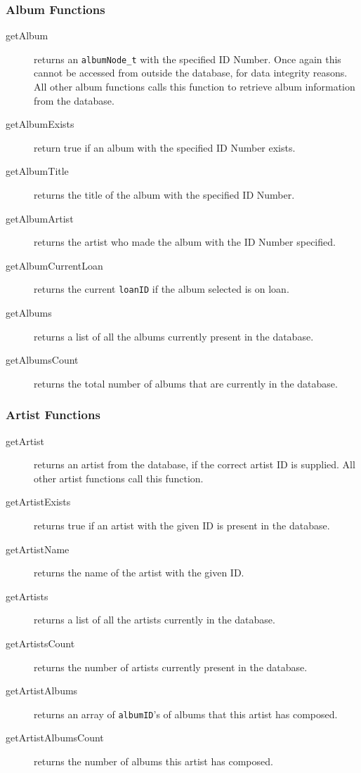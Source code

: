 \documentclass{article}
\begin{document}
\subsubsection{Album Functions}
\begin{description}
\item[getAlbum] returns an \verb|albumNode_t| with the specified ID Number. Once again this cannot be accessed from outside the database, for data integrity reasons. All other album functions calls this function to retrieve album information from the database.
\item[getAlbumExists] return true if an album with the specified ID Number exists.
\item[getAlbumTitle] returns the title of the album with the specified ID Number.
\item[getAlbumArtist] returns the artist who made the album with the ID Number specified.
\item[getAlbumCurrentLoan] returns the current \verb|loanID| if the album selected is on loan.
\item[getAlbums] returns a list of all the albums currently present in the database.
\item[getAlbumsCount] returns the total number of albums that are currently in the database.
\end{description}

\subsubsection{Artist Functions}
\begin{description}
\item[getArtist] returns an artist from the database, if the correct artist ID is supplied. All other artist functions call this function.
\item[getArtistExists] returns true if an artist with the given ID is present in the database.
\item[getArtistName] returns the name of the artist with the given ID.
\item[getArtists] returns a list of all the artists currently in the database.
\item[getArtistsCount] returns the number of artists currently present in the database.
\item[getArtistAlbums] returns an array of \verb|albumID|'s of albums that this artist has composed.
\item[getArtistAlbumsCount] returns the number of albums this artist has composed.
\end{description}
\end{document}
